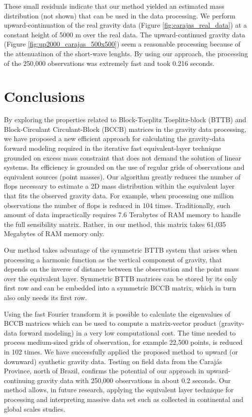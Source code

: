 \documentclass[manuscript,revised]{geophysics}
\begin{document}
These small residuals indicate that our method yielded an estimated mass distribution (not shown) that can be used in the data processing. We perform upward-continuation of the real gravity data (Figure \ref{fig:carajas_real_data}) at a constant height of 5000 m over the real data. The upward-continued gravity data (Figure \ref{fig:up2000_carajas_500x500}) seem a reasonable processing because of the attenuatinon of the short-wave lenghts. By using our approach, the processing of the 250,000 observations was extremely fast and took 0.216 seconds.


\section{Conclusions}
By exploring the properties related to Block-Toeplitz Toeplitz-block (BTTB) and Block-Circulant Circulant-Block (BCCB) matrices in the gravity data processing, we have proposed a new efficient approach for calculating the gravity-data forward modeling required in the iterative fast equivalent-layer technique grounded on excess mass constraint that does not demand  the solution of linear systems.  Its efficiency is grounded on the use of regular grids of observations and equivalent sources (point masses). Our algorithm greatly reduces the number of  flops necessary to estimate a 2D mass distribution within the equivalent layer that fits the observed gravity data. For example, when processing one million observations the number of flops is reduced in 104 times. Traditionally, such amount of data impractically requires 7.6 Terabytes of RAM memory to handle the full sensibility matrix. Rather, in our method, this matrix takes 61,035 Megabytes of RAM memory only.

Our method takes advantage of the symmetric BTTB system that arises when processing a harmonic function as the vertical component of gravity, that depends on the inverse
of distance between the observation and the point mass over the equivalent layer. Symmetric BTTB matrices can be stored by its only first row and can be embedded into a symmetric BCCB matrix, which in turn also only needs its first row.

Using the fast Fourier transform it is possible to calculate the eigenvalues of BCCB matrices which can
be used to compute a matrix-vector product (gravity-data forward modeling) in a very low computational cost. The time
needed to process medium-sized grids of observation, for example 22,500 points, is reduced in 102 times. We have successfully applied the proposed method to upward (or downward) synthetic gravity data. Testing on field data from the Caraj\'as Province, north of Brazil, confirms the potential of our approach in upward-continuing  gravity data with 250,000 observations in  about 0.2 seconds.  Our method allows, in future research, applying the equivalent layer technique for processing and interpreting massive data set such as collected in continental and global scales studies.
\end{document}
